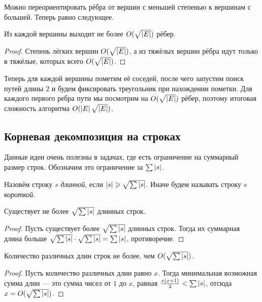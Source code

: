 Можно переориентировать рёбра от вершин с меньшей степенью к вершинам с большей. Теперь равно следующее.

\begin{lemma}
    Из каждой вершины выходит не более $O(\sqrt{\left\lvert E\right\rvert})$ рёбер.
\end{lemma}

\begin{proof}
    Степень лёгких вершин $O(\sqrt{\left\lvert E\right\rvert})$, а из тяжёлых вершин рёбра идут только в тяжёлые, которых всего $O(\sqrt{\left\lvert E\right\rvert})$.
\end{proof}

Теперь для каждой вершины пометим её соседей, после чего запустим поиск путей длины $2$ и будем фиксировать треугольник при нахождении пометки. Для каждого первого ребра пути мы посмотрим на $O(\sqrt{\left\lvert E\right\rvert})$ рёбер, поэтому итоговая сложность алгоритма $O(\left\lvert E\right\rvert\sqrt{\left\lvert E\right\rvert})$.

\subsection{Корневая декомпозиция на строках}

Данные идеи очень полезны в задачах, где есть ограничение на суммарный размер строк. Обозначим это ограничение за $\sum\limits\left\lvert s\right\rvert$.

\begin{definition}
    Назовём строку $s$ \textit{длинной}, если $\left\lvert s\right\rvert \geqslant \sqrt{\sum\left\lvert s\right\rvert}$. Иначе будем называть строку $s$ \textit{короткой}.
\end{definition}

\begin{lemma}
    Существует не более $\sqrt{\sum\left\lvert s\right\rvert}$ длинных строк.
\end{lemma}

\begin{proof}
    Пусть существует более $\sqrt{\sum\left\lvert s\right\rvert}$ длинных строк. Тогда их суммарная длина больше $\sqrt{\sum\left\lvert s\right\rvert} \cdot \sqrt{\sum\left\lvert s\right\rvert} = \sum\left\lvert s\right\rvert$, противоречие.
\end{proof}

\begin{lemma}
    Количество различных длин строк не более, чем $O(\sqrt{\sum\left\lvert s\right\rvert})$.
\end{lemma}

\begin{proof}
    Пусть количество различных длин равно $x$. Тогда минимальная возможная сумма длин --- это сумма чисел от $1$ до $x$, равная $\frac{x(x + 1)}{2} < \sum\left\lvert s\right\rvert$, отсюда $x = O(\sqrt{\sum\left\lvert s\right\rvert})$.
\end{proof}

